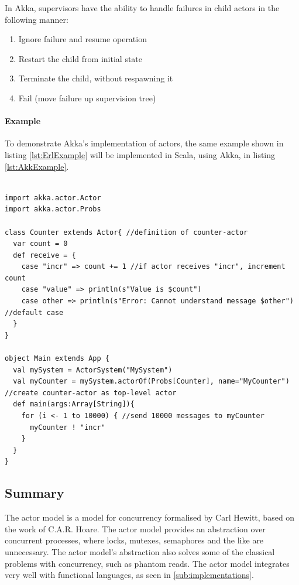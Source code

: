 In Akka, supervisors have the ability to handle failures in child actors in the following manner:
\begin{enumerate}
  \item Ignore failure and resume operation
  \item Restart the child from initial state
  \item Terminate the child, without respawning it
  \item Fail (move failure up supervision tree)
\end{enumerate}

\paragraph{Example}
To demonstrate Akka's implementation of actors, the same example shown in listing \ref{lst:ErlExample} will be implemented in Scala, using Akka, in listing \ref{lst:AkkExample}.

\begin{lstlisting}[style = scala, caption={A simple message-counter in Scala.}, label=lst:AkkExample]

import akka.actor.Actor
import akka.actor.Probs

class Counter extends Actor{ //definition of counter-actor
  var count = 0
  def receive = {
    case "incr" => count += 1 //if actor receives "incr", increment count
    case "value" => println(s"Value is $count")
    case other => println(s"Error: Cannot understand message $other") //default case
  }
}

object Main extends App {
  val mySystem = ActorSystem("MySystem")
  val myCounter = mySystem.actorOf(Probs[Counter], name="MyCounter") //create counter-actor as top-level actor
  def main(args:Array[String]){
    for (i <- 1 to 10000) { //send 10000 messages to myCounter
      myCounter ! "incr"
    }
  }
}
\end{lstlisting}

\subsection{Summary}
The actor model is a model for concurrency formalised by Carl Hewitt, based on the work of C.A.R. Hoare. The actor model provides an abstraction over concurrent processes, where locks, mutexes, semaphores and the like are unnecessary. The actor model's abstraction also solves some of the classical problems with concurrency, such as phantom reads. The actor model integrates very well with functional languages, as seen in \cref{sub:implementations}.
